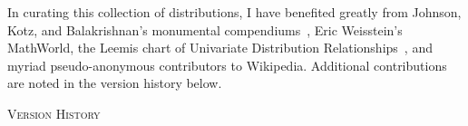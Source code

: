 


\clearpage



In curating this collection of distributions, I have benefited greatly from Johnson, Kotz, and Balakrishnan's monumental compendiums~\cite{Johnson1994, Johnson1995}, Eric Weisstein's MathWorld, the Leemis chart of Univariate Distribution Relationships~\cite{Leemis2008, Leemis2012}, and myriad pseudo-anonymous contributors to Wikipedia. Additional contributions are noted in the version history below.


\begin{center}
\textsc{Version History}
\end{center}

